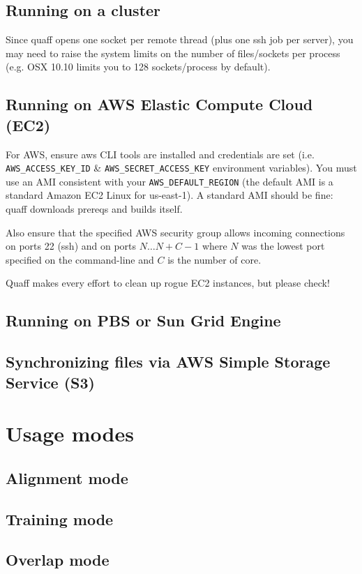 \documentclass{article}
\begin{document}
\subsection{Running on a cluster}

Since quaff opens one socket per remote thread (plus one ssh job per server),
you may need to raise the system limits on the number of files/sockets per process
(e.g. OSX 10.10 limits you to 128 sockets/process by default).

\subsection{Running on AWS Elastic Compute Cloud (EC2)}


For AWS, ensure aws CLI tools are installed and credentials are set
(i.e. {\tt AWS\_ACCESS\_KEY\_ID} \& {\tt AWS\_SECRET\_ACCESS\_KEY} environment variables).
You must use an AMI consistent with your {\tt AWS\_DEFAULT\_REGION}
(the default AMI is a standard Amazon EC2 Linux for us-east-1).
A standard AMI should be fine: quaff downloads prereqs and builds itself.

Also ensure that the specified AWS security group allows incoming connections
on ports 22 (ssh) and on ports $N \ldots N+C-1$ where $N$ was the lowest port
specified on the command-line and $C$ is the number of core.

Quaff makes every effort to clean up rogue EC2 instances, but please check!


\subsection{Running on PBS or Sun Grid Engine}

\subsection{Synchronizing files via AWS Simple Storage Service (S3)}


\section{Usage modes}

\subsection{Alignment mode}

\subsection{Training mode}

\subsection{Overlap mode}
\end{document}
